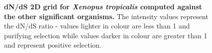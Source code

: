 \documentclass{article}
\begin{document}
\begin{figure}[H]
\centering
{}
\caption{\textbf{dN/dS 2D grid for \textit{Xenopus tropicalis} computed against the other significant organisms.} The intensity values represent the dN/dS ratio - values lighter in colour are less than 1 and purifying selection while values darker in colour are greater than 1 and represent positive selection.}
\label{sup_fig_34}
\end{figure}
\end{document}
